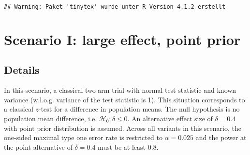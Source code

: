 \documentclass[
]{book}
\newenvironment{Shaded}{\begin{snugshade}}{\end{snugshade}}
\newcommand{\AttributeTok}[1]{\textcolor[rgb]{0.77,0.63,0.00}{#1}}
\newcommand{\CommentTok}[1]{\textcolor[rgb]{0.56,0.35,0.01}{\textit{#1}}}
\newcommand{\ControlFlowTok}[1]{\textcolor[rgb]{0.13,0.29,0.53}{\textbf{#1}}}
\newcommand{\DecValTok}[1]{\textcolor[rgb]{0.00,0.00,0.81}{#1}}
\newcommand{\FloatTok}[1]{\textcolor[rgb]{0.00,0.00,0.81}{#1}}
\newcommand{\FunctionTok}[1]{\textcolor[rgb]{0.00,0.00,0.00}{#1}}
\newcommand{\NormalTok}[1]{#1}
\newcommand{\OtherTok}[1]{\textcolor[rgb]{0.56,0.35,0.01}{#1}}
\newcommand{\SpecialCharTok}[1]{\textcolor[rgb]{0.00,0.00,0.00}{#1}}
\newcommand{\StringTok}[1]{\textcolor[rgb]{0.31,0.60,0.02}{#1}}
\begin{document}
\begin{verbatim}
## Warning: Paket 'tinytex' wurde unter R Version 4.1.2 erstellt
\end{verbatim}

\begin{Shaded}
\end{Shaded}

\hypertarget{scenarioI}{%
\chapter{Scenario I: large effect, point prior}\label{scenarioI}}

\hypertarget{details}{%
\section{Details}\label{details}}

In this scenario, a classical two-arm trial with normal
test statistic and known variance (w.l.o.g. variance of
the test statistic is 1).
This situation corresponds to a classical \(z\)-test for
a difference in population means.
The null hypothesis is no population mean difference, i.e.
\(\mathcal{H}_0:\delta \leq 0\).
An alternative effect size of \(\delta = 0.4\) with
point prior distribution is assumed.
Across all variants in this scenario, the one-sided maximal
type one error rate is restricted to \(\alpha=0.025\)
and the power at the point alternative of \(\delta=0.4\) must
be at least \(0.8\).
\end{document}
